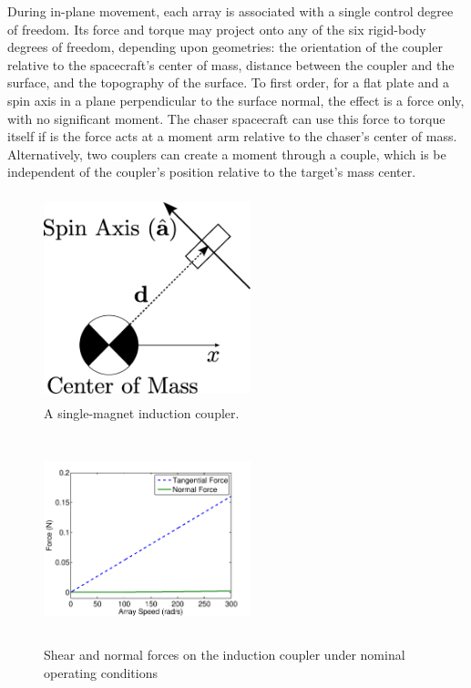 During in-plane movement, each array is associated with a single control degree of freedom. Its force and torque may project onto any of the six rigid-body degrees of freedom, depending upon geometries: the orientation of the coupler relative to the spacecraft's center of mass, distance between the coupler and the surface, and the topography of the surface. To first order, for a flat plate and a spin axis in a plane perpendicular to the surface normal, the effect is a force only, with no significant moment. The chaser spacecraft can use this force to torque itself if is the force acts at a moment arm relative to the chaser's center of mass. Alternatively, two couplers can create a moment through a couple, which is be independent of the coupler's position relative to the target's mass center.

\begin{figure}
\includegraphics[width = 6cm, height = 6cm ]{figures/simple_geometry.eps}

\caption{A single-magnet induction coupler.}
\label{fig:min_array_diagram}
\end{figure}

\begin{figure}
\includegraphics[width = 6cm, height = 6cm ]{figures/tan_v_norm_force.pdf}

\caption{Shear and normal forces on the induction coupler under nominal operating conditions}
\label{fig:tan_v_norm_f}
\end{figure}

